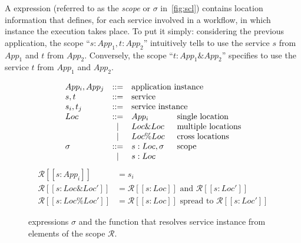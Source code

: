 %
A \scl expression (referred to as the \emph{scope} or $\sigma$
in~\autoref{fig:scl}) contains location information that defines, for
each service involved in a workflow, in which instance the execution
takes place.
%
To put it simply: considering the previous application, the scope
``$\mathit{s: App_1, t : App_2}$'' intuitively tells to use the
service $s$ from $App_1$ and $t$ from $App_2$.
%
Conversely, the scope ``$\mathit{t: App_1 \& App_2}$'' specifies to
use the service $t$ from $\mathit{App_1}$ and $\mathit{App_2}$.


\begin{figure}[hbtp]%
  \centering
  \footnotesize
  \[\begin{array}{l c l l}
      App_i,App_j  &::=  &\multicolumn{2}{l}{\text{application instance}}\\
      s,t          &::=  &\multicolumn{2}{l}{\text{service}}\\
      s_i,t_j      &::=  &\multicolumn{2}{l}{\text{service instance}}\\
      Loc      &::=  &App_i           &\enspace\text{single location}\\
                   &\mid &Loc \& Loc      &\enspace\text{multiple locations}\\
                   &\mid & Loc \% Loc     &\enspace\text{cross locations}\\
        \sigma   &::=  &s: Loc, \sigma  &\enspace\text{scope}\\
                 &\mid &s: Loc
      \end{array}\]
    \vspace{-5pt}
    \begin{align*}
    \mathcal{R}[\![ s : App_i ]\!]        &= s_i \\
    \mathcal{R}[\![ s : Loc \& Loc' ]\!]  &= \mathcal{R}[\![ s : Loc ]\!]  \text{ and }
                                            \mathcal{R}[\![ s : Loc' ]\!] \\
    \mathcal{R}[\![ s : Loc \% Loc' ]\!]  &= \mathcal{R}[\![ s : Loc ]\!]  \text{ spread to }  \mathcal{R}[\![ s : Loc' ]\!]
    \end{align*}

    \vspace{-5pt}
    \caption{\scl expressions $\sigma$ and the function that resolves
      service instance from elements of the scope $\mathcal{R}$.}
    \label{fig:scl}
\end{figure}


